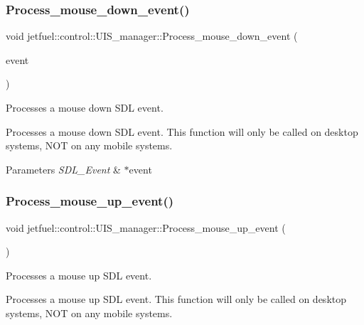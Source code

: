 \subsubsection{\texorpdfstring{Process\+\_\+mouse\+\_\+down\+\_\+event()}{Process\_mouse\_down\_event()}}
{\footnotesize\ttfamily void jetfuel\+::control\+::\+U\+I\+S\+\_\+manager\+::\+Process\+\_\+mouse\+\_\+down\+\_\+event (\begin{DoxyParamCaption}\item[{S\+D\+L\+\_\+\+Event $\ast$}]{event }\end{DoxyParamCaption})\hspace{0.3cm}{\ttfamily [protected]}}



Processes a mouse down S\+DL event. 

Processes a mouse down S\+DL event. This function will only be called on desktop systems, N\+OT on any mobile systems.


\begin{DoxyParams}{Parameters}
{\em S\+D\+L\+\_\+\+Event} & $\ast$event \\
\hline
\end{DoxyParams}
\mbox{\label{classjetfuel_1_1control_1_1UIS__manager_a17413f559bb86a914c39b96c442e2422}} 
\subsubsection{\texorpdfstring{Process\+\_\+mouse\+\_\+up\+\_\+event()}{Process\_mouse\_up\_event()}}
{\footnotesize\ttfamily void jetfuel\+::control\+::\+U\+I\+S\+\_\+manager\+::\+Process\+\_\+mouse\+\_\+up\+\_\+event (\begin{DoxyParamCaption}{ }\end{DoxyParamCaption})\hspace{0.3cm}{\ttfamily [protected]}}



Processes a mouse up S\+DL event. 

Processes a mouse up S\+DL event. This function will only be called on desktop systems, N\+OT on any mobile systems. \mbox{\label{classjetfuel_1_1control_1_1UIS__manager_afb60b0c7ac07dbe3657eb8a203c4bd45}} 
